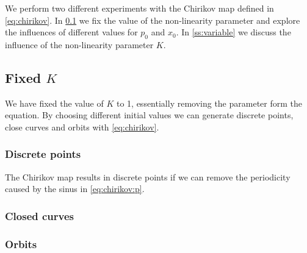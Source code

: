 We perform two different experiments with the Chirikov map defined in \cref{eq:chirikov}. In \cref{ss:fixed} we fix the value of the non-linearity parameter and explore the influences of different values for $p_0$ and $x_0$. In \cref{ss:variable} we discuss the influence of the non-linearity parameter $K$.

\subsection[]{Fixed $K$}
\label{ss:fixed}
	We have fixed the value of $K$ to 1, essentially removing the parameter form the equation. By choosing different initial values we can generate discrete points, close curves and orbits with \cref{eq:chirikov}.
	
	\subsubsection{Discrete points}
	The Chirikov map results in discrete points if we can remove the periodicity caused by the sinus in \eqref{eq:chirikov:p}.



	
	\subsubsection{Closed curves}

	\subsubsection{Orbits}	



	

